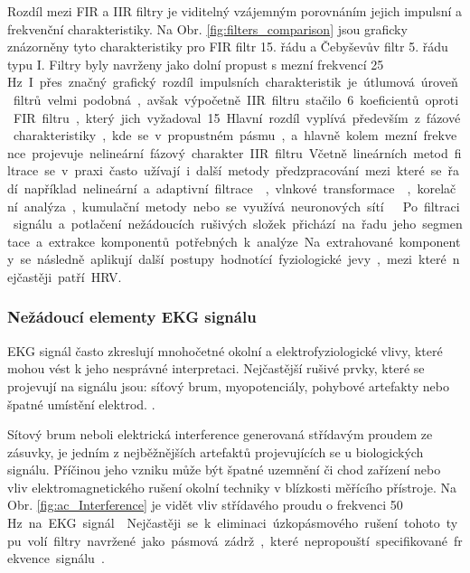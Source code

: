 Rozdíl mezi FIR a IIR filtry je viditelný vzájemným porovnáním jejich impulsní a
frekvenční charakteristiky. Na Obr. \ref{fig:filters_comparison} jsou graficky
znázorněny tyto charakteristiky pro FIR filtr 15. řádu a Čebyševův filtr 5. řádu
typu I. Filtry byly navrženy jako dolní propust s mezní frekvencí 25 \si\Hz. I
přes značný grafický rozdíl impulsních charakteristik je útlumová úroveň filtrů
velmi podobná, avšak výpočetně IIR filtru stačilo 6 koeficientů oproti FIR
filtru, který jich vyžadoval 15. Hlavní rozdíl vyplívá především z fázové
charakteristiky, kde se v propustném pásmu, a hlavně kolem mezní frekvence
projevuje nelineární fázový charakter IIR filtru.

Včetně lineárních metod filtrace se v praxi často užívají i další metody
předzpracování mezi které se řadí například nelineární a adaptivní filtrace
\cite{Sornmo1982,Pan1985}, vlnkové transformace \cite{Yao2020,Ndiaye2020},
korelační analýza, kumulační metody nebo se využívá neuronových
sítí\cite{Kiranyaz2016,Zhai2018} \cite{Jan2002}. Po filtraci signálu a potlačení
nežádoucích rušivých složek přichází na řadu jeho segmentace a extrakce
komponentů potřebných k analýze. Na extrahované komponenty se následně aplikují
další postupy hodnotící fyziologické jevy, mezi které nejčastěji patří HRV.

\subsubsection{Nežádoucí elementy EKG signálu}
EKG signál často zkreslují mnohočetné okolní a elektrofyziologické vlivy, které
mohou vést k jeho nesprávné interpretaci. Nejčastější rušivé prvky, které se
projevují na signálu jsou: síťový brum, myopotenciály, pohybové artefakty nebo
špatné umístění elektrod. \cite{Surawicz2008}.

Sítový brum neboli elektrická interference generovaná střídavým proudem ze
zásuvky, je jedním z nejběžnějších artefaktů projevujících se u biologických
signálu. Příčinou jeho vzniku může být špatné uzemnění či chod zařízení nebo
vliv elektromagnetického rušení okolní techniky v blízkosti měřícího přístroje.
Na Obr. \ref{fig:ac_Interference} je vidět vliv střídavého proudu o frekvenci 50
\si\Hz~na EKG signál \cite{Goldberger2017}. Nejčastěji se k eliminaci
úzkopásmového rušení tohoto typu volí filtry navržené jako pásmová zádrž, které
nepropouští specifikované frekvence signálu \cite{Kher2019}.

